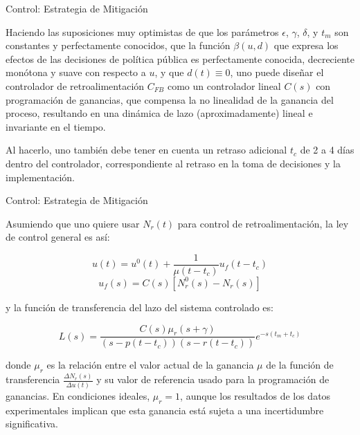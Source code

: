 \documentclass{beamer}
\begin{document}
\begin{frame}{Control: Estrategia de Mitigación}
\begin{justify}
\small

Haciendo las suposiciones muy optimistas de que los parámetros \( \epsilon \), \( \gamma \), \( \delta \), y \( t_m \) son constantes y perfectamente conocidos, que la función \( \beta(u, d) \) que expresa los efectos de las decisiones de política pública es perfectamente conocida, decreciente monótona y suave con respecto a \( u \), y que \( d(t) \equiv 0 \), uno puede diseñar el controlador de retroalimentación \( C_{FB} \) como un controlador lineal \( C(s) \) con programación de ganancias, que compensa la no linealidad de la ganancia del proceso, resultando en una dinámica de lazo (aproximadamente) lineal e invariante en el tiempo. 

\vspace{0.3cm}
Al hacerlo, uno también debe tener en cuenta un retraso adicional \( t_c \) de 2 a 4 días dentro del controlador, correspondiente al retraso en la toma de decisiones y la implementación. 
\end{justify}
\end{frame}

\begin{frame}{Control: Estrategia de Mitigación}
\begin{justify}
\small

Asumiendo que uno quiere usar \( N_r(t) \) para control de retroalimentación, la ley de control general es así:

\[
u(t) = u^0(t) + \frac{1}{\mu(t - t_c)} u_f(t - t_c)
\]
\[
u_f(s) = C(s) [N_r^0(s) - N_r(s)]
\]

\vspace{0.3cm}
y la función de transferencia del lazo del sistema controlado es:

\vspace{0.3cm}
\[
L(s) = \frac{C(s) \mu_r(s + \gamma)}{(s - p(t - t_c))(s - r(t - t_c))} e^{-s(t_m + t_c)}
\]

\vspace{0.3cm}
donde \( \mu_r \) es la relación entre el valor actual de la ganancia \( \mu \) de la función de transferencia $\frac{\Delta{N_r (s)}}{\Delta {u(t)}}$ y su valor de referencia usado para la programación de ganancias. En condiciones ideales, \( \mu_r = 1 \), aunque los resultados de los datos experimentales implican que esta ganancia está sujeta a una incertidumbre significativa.
\end{justify}
\end{frame}
\end{document}

